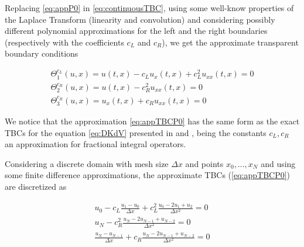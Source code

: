 \indent Replacing \eqref{eq:appP0} in \eqref{eq:continuousTBC}, using some well-know properties of the Laplace Transform (linearity and convolution) and considering possibly different polynomial approximations for the left and the right boundaries (respectively with the coefficients $c_L$ and $c_R$), we get the approximate transparent boundary conditions


\begin{equation}
  \label{eq:appTBCP0}
    \begin{gathered}
        \Theta_1^{c_L}(u,x) = u(t,x) - c_L u_x(t,x)  + c_L^2  u_{xx}(t,x) = 0 \\
        \Theta_2^{c_R}(u,x) =  u(t,x) - c_R^2    u_{xx}(t,x) = 0\\
        \Theta_3^{c_R} (u,x)= u_x(t,x) + c_R u_{xx}(t,x)  = 0
    \end{gathered}
\end{equation}

\indent We notice that the approximation \eqref{eq:appTBCP0} has the same form as the exact TBCs for the equation \eqref{eq:DKdV} presented in \cite{zheng2008} and \cite{besse2015}, being the constants $c_L,c_R$ an approximation for fractional integral operators. 

\indent Considering a discrete domain with mesh size $\Delta x$ and points $x_0, ..., x_N$ and using some finite difference approximations, the approximate TBCs (\ref{eq:appTBCP0}) are discretized as

\begin{equation}
\label{eq:appDiscTBCP0}
    \begin{gathered}
        u_0 - c_L \frac{u_1 - u_0}{\Delta x}  + c_L^2  \frac{u_0 -2u_1 + u_2}{\Delta x^2} = 0 \\
        u_N - c_R^2    \frac{u_N -2u_{N-1} + u_{N-2}}{\Delta x^2} = 0 \\
        \frac{u_N - u_{N-1}}{\Delta x}  + c_R    \frac{u_N -2u_{N-1} + u_{N-2}}{\Delta x^2} = 0 
    \end{gathered}
\end{equation}

